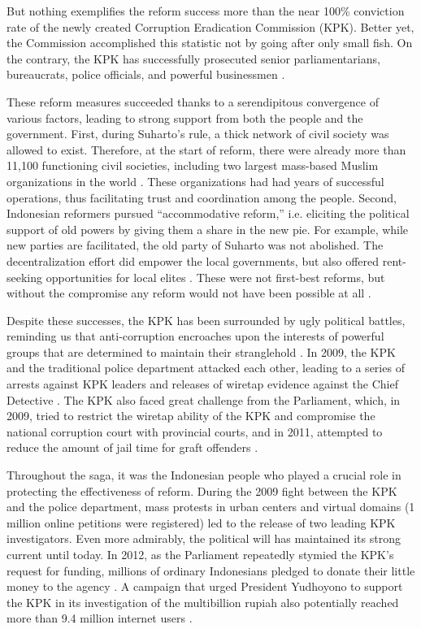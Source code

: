 \documentclass[12pt]{article}
\begin{document}
But nothing exemplifies the reform success more than the near 100\% conviction rate of the newly created Corruption Eradication Commission (KPK). Better yet, the Commission accomplished this statistic not by going after only small fish. On the contrary, the KPK has successfully prosecuted senior parliamentarians, bureaucrats, police officials, and powerful businessmen \citep{Schutte2012}.

These reform measures succeeded thanks to a serendipitous convergence of various factors, leading to strong support from both the people and the government. First, during Suharto's rule, a thick network of civil society was allowed to exist. Therefore, at the start of reform, there were already more than 11,100 functioning civil societies, including two largest mass-based Muslim organizations in the world \citep{Harris2011}. These organizations had had years of successful operations, thus facilitating trust and coordination among the people. Second, Indonesian reformers pursued ``accommodative reform,'' i.e. eliciting the political support of old powers by giving them a share in the new pie. For example, while new parties are facilitated, the old party of Suharto was not abolished. The decentralization effort did empower the local governments, but also offered rent-seeking opportunities for local elites \citep{Hadiz2004}. These were not first-best reforms, but without the compromise any reform would not have been possible at all \citep{Harris2011}.

Despite these successes, the KPK has been surrounded by ugly political battles, reminding us that anti-corruption encroaches upon the interests of powerful groups that are determined to maintain their stranglehold \citep{Kimura2011}. In 2009, the KPK and the traditional police department attacked each other, leading to a series of arrests against KPK leaders and releases of wiretap evidence against the Chief Detective \citep{Luebke2012}. The KPK also faced great challenge from the Parliament, which, in 2009, tried to restrict the wiretap ability of the KPK and compromise the national corruption court with provincial courts, and in 2011, attempted to reduce the amount of jail time for graft offenders \citep{TransparencyInternational2011}.

Throughout the saga, it was the Indonesian people who played a crucial role in protecting the effectiveness of reform. During the 2009 fight between the KPK and the police department, mass protests in urban centers and virtual domains (1 million online petitions were registered) led to the release of two leading KPK investigators. Even more admirably, the political will has maintained its strong current until today. In 2012, as the Parliament repeatedly stymied the KPK's request for funding, millions of ordinary Indonesians pledged to donate their little money to the agency \citep{Jaaffar2012}. A campaign that urged President Yudhoyono to support the KPK in its investigation of the multibillion rupiah also potentially reached more than 9.4 million internet users \citep{Mahditama2012}.
\end{document}
